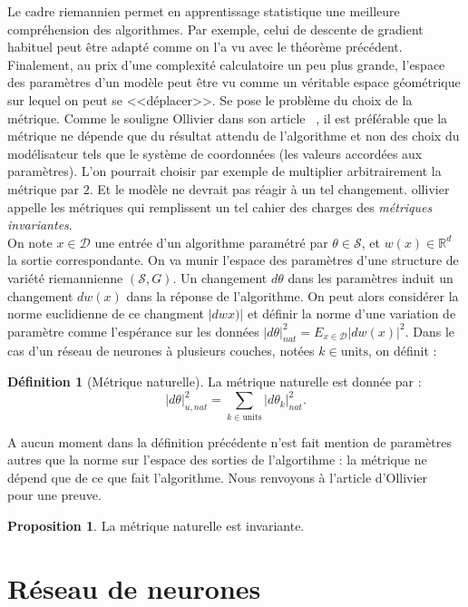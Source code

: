 \documentclass{article}
\theoremstyle{definition}
\newtheorem{definition}{Définition}
\newtheorem{prop}{Proposition}
\newcommand{\R}{\mathbb R}
\begin{document}
Le cadre riemannien permet en apprentissage statistique une meilleure compréhension des algorithmes. Par exemple, celui de descente de gradient habituel peut être adapté comme on l'a vu avec le théorème précédent. Finalement, au prix d'une complexité calculatoire un peu plus grande, l'espace des paramètres d'un modèle peut être vu comme un véritable espace géométrique sur lequel on peut se <<déplacer>>. Se pose le problème du choix de la métrique. Comme le souligne Ollivier dans son article ~\cite{Ollivier}, il est préférable que la métrique ne dépende que du résultat attendu de l'algorithme et non des choix du modélisateur tels que le système de coordonnées (les valeurs accordées aux paramètres). L'on pourrait choisir par exemple de multiplier arbitrairement la métrique par $2$. Et le modèle ne devrait pas réagir à un tel changement. ollivier appelle les métriques qui remplissent un tel cahier des charges des \textit{métriques invariantes}.\\

On note $x\in \mathcal D$ une entrée d'un algorithme paramétré par $\theta \in \mathcal S$, et $w(x)\in \R^d$ la sortie correspondante. On va munir l'espace des paramètres d'une structure de variété riemannienne $(\mathcal S, G)$. Un changement $d\theta$ dans les paramètres induit un changement $dw(x)$ dans la réponse de l'algorithme. On peut alors considérer la norme euclidienne de ce changment $|dwx)|$ et définir la norme d'une variation de paramètre comme l'espérance sur les données $|d\theta|_{nat}^2=E_{x\in \mathcal D}|dw(x)|^2$. Dans le cas d'un réseau de neurones à plusieurs couches, notées $k\in \text{units}$, on définit :
\begin{definition}[Métrique naturelle]
La métrique naturelle est donnée par :
\[|d\theta|_{u,nat}^2=\sum_{k\in\text{units}} |d\theta_k|_{nat}^2.\]
\end{definition}

A aucun moment dans la définition précédente n'est fait mention de paramètres autres que la norme sur l'espace des sorties de l'algortihme : la métrique ne dépend que de ce que fait l'algorithme. Nous renvoyons à l'article d'Ollivier ~\cite{Ollivier} pour une preuve.
\begin{prop}
La métrique naturelle est invariante.
\end{prop}
\section{Réseau de neurones}
\end{document}
